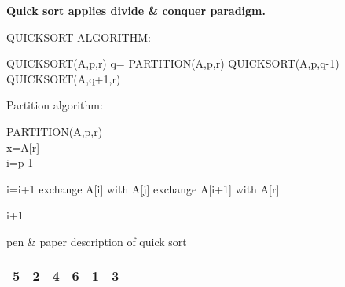 \documentclass[12pt,a4paper]{article}
\begin{document}


\newpage
\begin{center}
\textbf{Quick sort applies  divide \& conquer paradigm. }\\
\end{center}

\begin{algorithm}
\caption{QUICKSORT ALGORITHM: }
\vspace*{.2 cm}
\begin{algorithmic}

\STATE QUICKSORT(A,p,r)
\STATE q= PARTITION(A,p,r)
\STATE QUICKSORT(A,p,q-1)
\STATE QUICKSORT(A,q+1,r) 
\ENDIF
\end{algorithmic}
\end{algorithm}


\vspace{1 cm}

\begin{algorithm}
\caption{Partition algorithm: } 
\begin{algorithmic}
\STATE PARTITION(A,p,r)\\
\STATE x=A[r]\\
\STATE i=p-1 \\

\STATE i=i+1 
\ENDIF
\STATE exchange A[i] with A[j]
\ENDFOR
\STATE exchange A[i+1] with A[r]

\RETURN i+1 
 
\end{algorithmic}

\end{algorithm}


pen \& paper description of quick sort\: \\


\begin{center}
\begin{table}[H]
\label{Array A[]}
\begin{tabular}{|l|l|l|l|l|l|}
\hline
5 & 2 & 4 & 6 & 1 & 3 \\ \hline
\end{tabular}
\end{table}
\end{center}


\end{document}
